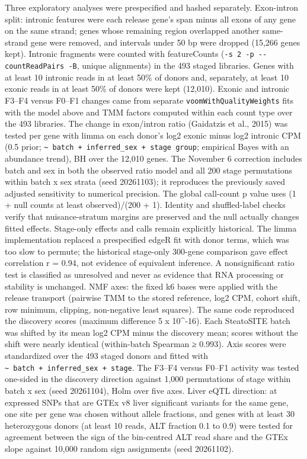 Three exploratory analyses were prespecified and hashed separately. Exon-intron split: intronic features were each release gene's span minus all exons of any gene on the same strand; genes whose remaining region overlapped another same-strand gene were removed, and intervals under 50 bp were dropped (15,266 genes kept). Intronic fragments were counted with featureCounts (\texttt{-s\ 2\ -p\ -\/-countReadPairs\ -B}, unique alignments) in the 493 staged libraries. Genes with at least 10 intronic reads in at least 50\% of donors and, separately, at least 10 exonic reads in at least 50\% of donors were kept (12,010). Exonic and intronic F3--F4 versus F0--F1 changes came from separate \texttt{voomWithQualityWeights} fits with the model above and TMM factors computed within each count type over the 493 libraries. The change in exon/intron ratio (Gaidatzis et al., 2015) was tested per gene with limma on each donor's log2 exonic minus log2 intronic CPM (0.5 prior; \texttt{\textasciitilde{}\ batch\ +\ inferred\_\allowbreak{}sex\ +\ stage\ group}; empirical Bayes with an abundance trend), BH over the 12,010 genes. The November 6 correction includes batch and sex in both the observed ratio model and all 200 stage permutations within batch x sex strata (seed 20261103); it reproduces the previously saved adjusted sensitivity to numerical precision. The global call-count p value uses (1 + null counts at least observed)/(200 + 1). Identity and shuffled-label checks verify that nuisance-stratum margins are preserved and the null actually changes fitted effects. Stage-only effects and calls remain explicitly historical. The limma implementation replaced a prespecified edgeR fit with donor terms, which was too slow to permute; the historical stage-only 300-gene comparison gave effect correlation r = 0.94, not evidence of equivalent inference. A nonsignificant ratio test is classified as unresolved and never as evidence that RNA processing or stability is unchanged. NMF axes: the fixed k6 bases were applied with the release transport (pairwise TMM to the stored reference, log2 CPM, cohort shift, row minimum, clipping, non-negative least squares). The same code reproduced the discovery scores (maximum difference 5 x 10\^{}-16). Each SteatoSITE batch was shifted by its mean log2 CPM minus the discovery mean; scores without the shift were nearly identical (within-batch Spearman ≥ 0.993). Axis scores were standardized over the 493 staged donors and fitted with \texttt{\textasciitilde{}\ batch\ +\ inferred\_\allowbreak{}sex\ +\ stage}. The F3--F4 versus F0--F1 activity was tested one-sided in the discovery direction against 1,000 permutations of stage within batch x sex (seed 20261104), Holm over five axes. Liver eQTL direction: at expressed SNPs that are GTEx v8 liver significant variants for the same gene, one site per gene was chosen without allele fractions, and genes with at least 30 heterozygous donors (at least 10 reads, ALT fraction 0.1 to 0.9) were tested for agreement between the sign of the bin-centred ALT read share and the GTEx slope against 10,000 random sign assignments (seed 20261102).

